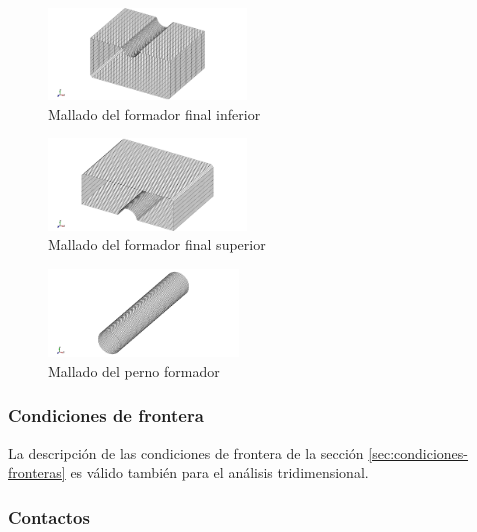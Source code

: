 \begin{figure}[H]
\centering
\includegraphics[width=0.47\textwidth]{src/ch3/mesh_ffi.png}
\caption{Mallado del formador final inferior}
\label{fig:mesh_ffi}
\end{figure}

\begin{figure}[H]
\centering
\includegraphics[width=0.47\textwidth]{src/ch3/mesh_ffs.png}
\caption{Mallado del formador final superior}
\label{fig:mesh_ffs}
\end{figure}

\begin{figure}[H]
\centering
\includegraphics[width=0.45\textwidth]{src/ch3/mesh_perno.png}
\caption{Mallado del perno formador}
\label{fig:mesh_perno}
\end{figure}


\subsubsection{Condiciones de frontera}

La descripción de las condiciones de frontera de la sección \ref{sec:condiciones-fronteras} es 
válido también para el análisis tridimensional.

\subsubsection{Contactos}

